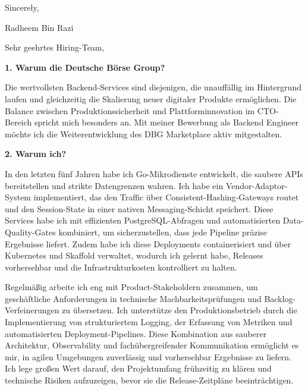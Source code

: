 \documentclass[11pt,a4paper]{coverletter}
\begin{document}
\closing{Sincerely,}{Radheem Bin Razi}

\clearpage
{}


\opening{Sehr geehrtes Hiring-Team,}

\vspace{8pt}\noindent\textbf{1. Warum die Deutsche Börse Group?}\par\vspace{3pt}

Die wertvollsten Backend-Services sind diejenigen, die unauffällig im Hintergrund laufen und gleichzeitig die Skalierung neuer digitaler Produkte ermöglichen. Die Balance zwischen Produktionssicherheit und Plattforminnovation im CTO-Bereich spricht mich besonders an. Mit meiner Bewerbung als Backend Engineer möchte ich die Weiterentwicklung des DBG Marketplace aktiv mitgestalten.

\vspace{8pt}\noindent\textbf{2. Warum ich?}\par\vspace{3pt}

In den letzten fünf Jahren habe ich Go-Mikrodienste entwickelt, die saubere APIs bereitstellen und strikte Datengrenzen wahren. Ich habe ein Vendor-Adaptor-System implementiert, das den Traffic über Consistent-Hashing-Gateways routet und den Session-State in einer nativen Messaging-Schicht speichert. Diese Services habe ich mit effizienten PostgreSQL-Abfragen und automatisierten Data-Quality-Gates kombiniert, um sicherzustellen, dass jede Pipeline präzise Ergebnisse liefert. Zudem habe ich diese Deployments containerisiert und über Kubernetes und Skaffold verwaltet, wodurch ich gelernt habe, Releases vorhersehbar und die Infrastrukturkosten kontrolliert zu halten.

Regelmäßig arbeite ich eng mit Product-Stakeholdern zusammen, um geschäftliche Anforderungen in technische Machbarkeitsprüfungen und Backlog-Verfeinerungen zu übersetzen. Ich unterstütze den Produktionsbetrieb durch die Implementierung von strukturiertem Logging, der Erfassung von Metriken und automatisierten Deployment-Pipelines. Diese Kombination aus sauberer Architektur, Observability und fachübergreifender Kommunikation ermöglicht es mir, in agilen Umgebungen zuverlässig und vorhersehbar Ergebnisse zu liefern. Ich lege großen Wert darauf, den Projektumfang frühzeitig zu klären und technische Risiken aufzuzeigen, bevor sie die Release-Zeitpläne beeinträchtigen.
\end{document}
